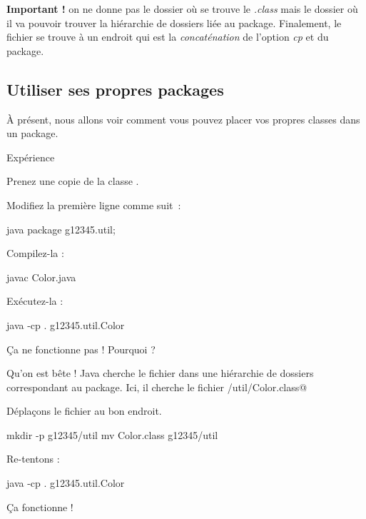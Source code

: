 \documentclass[a4paper,11pt]{article}
\begin{document}
           	 \par
        			\textbf{Important ! } on ne donne pas le dossier o\`u se trouve le \textit{.class}
			mais le dossier o\`u il va pouvoir trouver la hi\'erarchie de dossiers li\'ee au package.
			Finalement, le fichier se trouve \`a un endroit qui est la \textit{concat\'enation} de l'option \textit{cp}
			et du package.
		
            \par

	 \subsection{Utiliser ses propres packages}
		\`A pr\'esent, nous allons voir comment vous pouvez placer vos propres classes dans un package.
		
            \par
        
			
		\begin{Tutoriel}{Exp\'erience} 
         		\begin{steps}
				\item Prenez une copie de la classe \verb@Color@.	
			
				\item Modifiez la première ligne comme suit~:
					\begin{Code}{java}
						package g12345.util;
					\end{Code}
				\item Compilez-la : 
					\begin{Console}
						javac Color.java
					\end{Console}
				\item Ex\'ecutez-la : 
					\begin{Console}
						java -cp . g12345.util.Color
					\end{Console}
				\par
				
					\c Ca ne fonctionne pas ! Pourquoi ?
			
				 Qu'on est b\^ete ! Java cherche le fichier dans une hi\'erarchie
				de dossiers correspondant au package. Ici, il cherche le fichier
				/util/Color.class@
					
				\item D\'epla\c cons le fichier au bon endroit.
				\par
					\begin{Console}
						mkdir -p g12345/util
						mv Color.class g12345/util
					\end{Console}
				\item Re-tentons : 
					\begin{Console}
						java -cp . g12345.util.Color
					\end{Console}
				\par
				
				\c Ca fonctionne !
			
					\end{steps}
				\end{Tutoriel}
			
\end{document}
